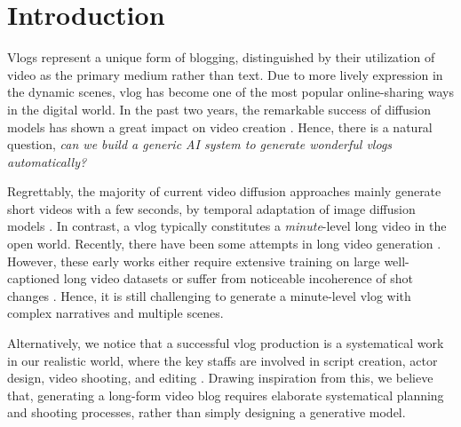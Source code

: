 \section{Introduction}
\label{sec:intro}

Vlogs represent a unique form of blogging, distinguished by their utilization of video as the primary medium rather than text.
Due to more lively expression in the dynamic scenes,
vlog has become one of the most popular online-sharing ways in the digital world. 
In the past two years,
the remarkable success of diffusion models \cite{song2021scorebased, ho2020denoising, ho2021classifierfree} has shown a great impact on video creation \cite{singer2023makeavideo, Ho2022ImagenVH, blattmann2023align, Ge2023PreserveYO, Wang2023ModelScopeTT, Yin2023NUWAXLDO, Zhang2023Show1MP, Wang2023LAVIEHV}.
Hence,
there is a natural question, 
\textit{can we build a generic AI system to generate wonderful vlogs automatically?}


Regrettably, the majority of current video diffusion approaches mainly generate short videos with a few seconds, by temporal adaptation of image diffusion models \cite{singer2023makeavideo, blattmann2023align, Wang2023ModelScopeTT, Zhang2023Show1MP, Wang2023LAVIEHV, Ge2023PreserveYO}.
In contrast,
a vlog typically constitutes a \textit{minute}-level long video in the open world. %
Recently,
there have been some attempts in long video generation \cite{villegas2023phenaki, Yin2023NUWAXLDO}.
However,
these early works either require extensive training on large well-captioned long video datasets \cite{Yin2023NUWAXLDO}
or suffer from noticeable incoherence of shot changes \cite{villegas2023phenaki}. 
Hence,
it is still challenging to generate a minute-level vlog with complex narratives and multiple scenes.


Alternatively,
we notice that
a successful vlog production is a systematical work in our realistic world,
where
the key staffs are involved in
script creation,
actor design, 
video shooting, and 
editing \cite{gao2010vlogging}. 
Drawing inspiration from this,
we believe that,
generating a long-form video blog requires elaborate systematical planning and shooting processes,
rather than simply designing a generative model.

